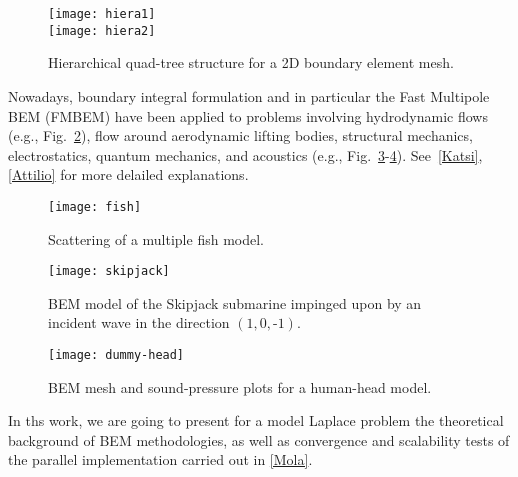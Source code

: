 \begin{figure}
  \begin{center}
    \texttt{[image: hiera1]} \\
    \texttt{[image: hiera2]}   %
    \caption{Hierarchical quad-tree structure for a 2D boundary element mesh.} 
    \label{fig:hiera}
  \end{center}
\end{figure}

Nowadays, boundary integral formulation and in particular the Fast Multipole BEM (FMBEM) have been applied to problems involving hydrodynamic flows (e.g., Fig.~\ref{fig:fish}), flow around aerodynamic lifting bodies, structural mechanics, electrostatics, quantum mechanics, and acoustics (e.g., Fig.~\ref{fig:skipjack}-\ref{fig:dummy-head}). See~\ref{Katsi},\ref{Attilio} for more delailed explanations. 

\begin{figure}
  \begin{center}
    \texttt{[image: fish]}    %
    \caption{Scattering of a multiple fish model.} 
    \label{fig:fish}
  \end{center}
\end{figure}

\begin{figure}
  \begin{center}
    \texttt{[image: skipjack]}    %
    \caption{BEM model of the Skipjack submarine impinged upon by an incident wave in the direction $(1, 0, \text{-}1)$.} 
    \label{fig:skipjack}
  \end{center}
\end{figure}

\begin{figure}
  \begin{center}
    \texttt{[image: dummy-head]}    %
    \caption{BEM mesh and sound-pressure plots for a human-head model.} 
    \label{fig:dummy-head}
  \end{center}
\end{figure}

In ths work, we are going to present for a model Laplace problem the theoretical background of BEM methodologies, as well as convergence and scalability tests of the parallel implementation carried out in \ref{Mola}.







